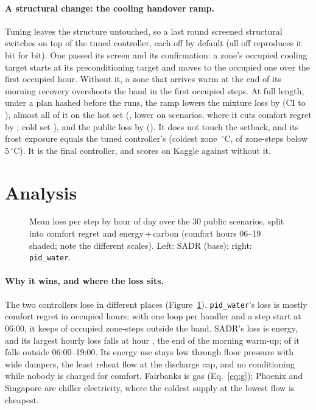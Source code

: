 \paragraph{A structural change: the cooling handover ramp.} Tuning leaves the structure untouched, so a last round screened \RFtNScreen{} structural switches on top of the tuned controller, each off by default (all off reproduces it bit for bit). One passed its screen and its confirmation: a zone's occupied cooling target starts at its preconditioning target and moves to the occupied one over the first occupied hour. Without it, a zone that arrives warm at the end of its morning recovery overshoots the band in the first occupied steps. At full length, under a plan hashed before the runs, the ramp lowers the mixture loss by \RFtMixAbs{} (CI \RFtMixLo{} to \RFtMixHi), almost all of it on the hot set (\RFtHH, lower on \RFtHHWins{} scenarios, where it cuts comfort regret by \RFtHHRegretCut; cold set \RFtHCThree), and the public loss by \RFtPubAbs{} (\RFtPubWins). It does not touch the setback, and its frost exposure equals the tuned controller's (coldest zone \RFtColdest\,$^\circ$C, \RFtBelowFive{} of zone-steps below 5\,$^\circ$C). It is the final controller, and scores \RFtKagVFourteen{} on Kaggle against \RTwKagVThirteen{} without it.



\section{Analysis}
\label{sec:analysis}

\begin{figure}[t]
\centering
{}
\caption{Mean loss per step by hour of day over the 30 public scenarios, split into comfort regret and energy\,+\,carbon (comfort hours 06--19 shaded; note the different scales). Left: SADR (base); right: \texttt{pid\_water}.}
\label{fig:hours12}
\end{figure}

\paragraph{Why it wins, and where the loss sits.} The two controllers lose in different places (Figure~\ref{fig:hours12}). \texttt{pid\_water}'s loss is mostly comfort regret in occupied hours: with one loop per handler and a step start at 06:00, it keeps \OccOutPidWater{} of occupied zone-steps outside the band. SADR's loss is energy, and its largest hourly loss falls at hour \RElvHourPeak{}, the end of the morning warm-up; \RElvUnoccHourShare{} of it falls outside 06:00--19:00. Its energy use stays low through floor pressure with wide dampers, the least reheat flow at the discharge cap, and no conditioning while nobody is charged for comfort. Fairbanks is gas (Eq.~\ref{eq:g}); Phoenix and Singapore are chiller electricity, where the coldest supply at the lowest flow is cheapest.


